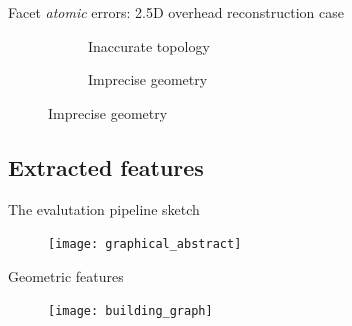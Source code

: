 \documentclass[export]{beamer}
\begin{document}
\begin{frame}{Facet \textit{atomic} errors: 2.5D overhead reconstruction case}
\begin{figure}
\begin{center}
\begin{subfigure}{.28\textwidth}
                            \caption{\label{fig::fac_height} Inaccurate topology}
                        \end{subfigure}
                        \hspace{10pt}
                        \begin{subfigure}{.28\textwidth}
                            \caption{\label{fig::fac_height} Imprecise geometry}
                        \end{subfigure}
                    \end{center}
                \end{figure}
            \end{frame}
        \subsection{Extracted features}
            \begin{frame}{The evalutation pipeline sketch}
                \begin{figure}
                    \texttt{[image: graphical\_abstract]}
                \end{figure}
            \end{frame}

            \begin{frame}{Geometric features}
                \begin{figure}
                    \texttt{[image: building\_graph]}
                \end{figure}
            \end{frame}
        
\end{document}
